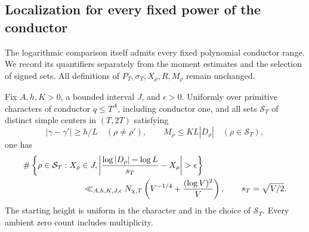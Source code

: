 \subsection{Localization for every fixed power of the conductor}

The logarithmic comparison itself admits every fixed polynomial
conductor range. We record its quantifiers separately from the
moment estimates and the selection of signed sets. All definitions of
$P_T,\sigma_T,X_\rho,R,M_\rho$ remain unchanged.

\begin{proposition}\label{prop:uniform-separated-log-localization}
Fix $A,h,K>0$, a bounded interval $J$, and $\epsilon>0$.
Uniformly over primitive characters of conductor $q\le T^A$,
including conductor one, and all sets $\mathcal S_T$ of distinct
simple centers in $(T,2T)$ satisfying
\[
 |\gamma-\gamma'|\ge h/L\quad(\rho\ne\rho'),\qquad
 M_\rho\le KL|D_\rho|\quad(\rho\in\mathcal S_T),
\]
one has
\begin{align}
 &\#\left\{\rho\in\mathcal S_T:X_\rho\in J,
 \left|\frac{\log|D_\rho|-\log L}{s_T}-X_\rho\right|>\epsilon
 \right\}\nonumber\\
 &\hspace{25mm}\ll_{A,h,K,J,\epsilon}
 N_{\chi,T}\left(V^{-1/4}+\frac{(\log V)^2}{V}\right),
 \qquad s_T=\sqrt{V/2}.\label{eq:polynomial-conductor-localization}
\end{align}
The starting height is uniform in the character and in the choice of
$\mathcal S_T$. Every ambient zero count includes multiplicity.
\end{proposition}

